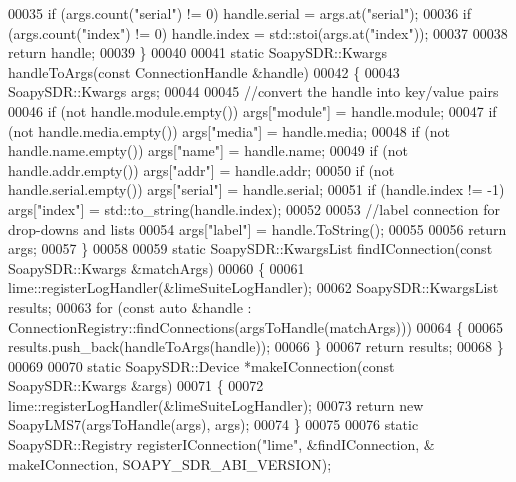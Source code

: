 \begin{DoxyCode}
00035     \textcolor{keywordflow}{if} (args.count(\textcolor{stringliteral}{"serial"}) != 0) handle.serial = args.at(\textcolor{stringliteral}{"serial"});
00036     \textcolor{keywordflow}{if} (args.count(\textcolor{stringliteral}{"index"}) != 0) handle.index = std::stoi(args.at(\textcolor{stringliteral}{"index"}));
00037 
00038     \textcolor{keywordflow}{return} handle;
00039 \}
00040 
00041 \textcolor{keyword}{static} SoapySDR::Kwargs handleToArgs(\textcolor{keyword}{const} ConnectionHandle &handle)
00042 \{
00043     SoapySDR::Kwargs args;
00044 
00045     \textcolor{comment}{//convert the handle into key/value pairs}
00046     \textcolor{keywordflow}{if} (not handle.module.empty()) args[\textcolor{stringliteral}{"module"}] = handle.module;
00047     if (not handle.media.empty()) args[\textcolor{stringliteral}{"media"}] = handle.media;
00048     if (not handle.name.empty()) args[\textcolor{stringliteral}{"name"}] = handle.name;
00049     if (not handle.addr.empty()) args[\textcolor{stringliteral}{"addr"}] = handle.addr;
00050     if (not handle.serial.empty()) args[\textcolor{stringliteral}{"serial"}] = handle.serial;
00051     if (handle.index != -1) args[\textcolor{stringliteral}{"index"}] = std::to\_string(handle.index);
00052 
00053     \textcolor{comment}{//label connection for drop-downs and lists}
00054     args[\textcolor{stringliteral}{"label"}] = handle.ToString();
00055 
00056     \textcolor{keywordflow}{return} args;
00057 \}
00058 
00059 \textcolor{keyword}{static} SoapySDR::KwargsList findIConnection(\textcolor{keyword}{const} SoapySDR::Kwargs &matchArgs)
00060 \{
00061     lime::registerLogHandler(&limeSuiteLogHandler);
00062     SoapySDR::KwargsList results;
00063     \textcolor{keywordflow}{for} (\textcolor{keyword}{const} \textcolor{keyword}{auto} &handle : ConnectionRegistry::findConnections(argsToHandle(matchArgs)))
00064     \{
00065         results.push\_back(handleToArgs(handle));
00066     \}
00067     \textcolor{keywordflow}{return} results;
00068 \}
00069 
00070 \textcolor{keyword}{static} SoapySDR::Device *makeIConnection(\textcolor{keyword}{const} SoapySDR::Kwargs &args)
00071 \{
00072     lime::registerLogHandler(&limeSuiteLogHandler);
00073     \textcolor{keywordflow}{return} \textcolor{keyword}{new} SoapyLMS7(argsToHandle(args), args);
00074 \}
00075 
00076 \textcolor{keyword}{static} SoapySDR::Registry registerIConnection(\textcolor{stringliteral}{"lime"}, &findIConnection, &
      makeIConnection, SOAPY\_SDR\_ABI\_VERSION);
\end{DoxyCode}
